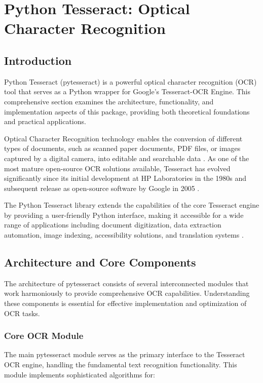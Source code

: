 \chapter{Python Tesseract: Optical Character Recognition}

\section{Introduction}
Python Tesseract (pytesseract) is a powerful optical character recognition (OCR) tool that serves as a Python wrapper for Google's Tesseract-OCR Engine. This comprehensive section examines the architecture, functionality, and implementation aspects of this package, providing both theoretical foundations and practical applications.

Optical Character Recognition technology enables the conversion of different types of documents, such as scanned paper documents, PDF files, or images captured by a digital camera, into editable and searchable data \cite{Anitha:2024}. As one of the most mature open-source OCR solutions available, Tesseract has evolved significantly since its initial development at HP Laboratories in the 1980s and subsequent release as open-source software by Google in 2005 \cite{Betterpath:2023}.

The Python Tesseract library extends the capabilities of the core Tesseract engine by providing a user-friendly Python interface, making it accessible for a wide range of applications including document digitization, data extraction automation, image indexing, accessibility solutions, and translation systems \cite{DataCamp:2024}.

\section{Architecture and Core Components}
\label{sec:architecture}

The architecture of pytesseract consists of several interconnected modules that work harmoniously to provide comprehensive OCR capabilities. Understanding these components is essential for effective implementation and optimization of OCR tasks.

\subsection{Core OCR Module}
\label{subsec:core_ocr}

The main pytesseract module serves as the primary interface to the Tesseract OCR engine, handling the fundamental text recognition functionality. This module implements sophisticated algorithms for:

